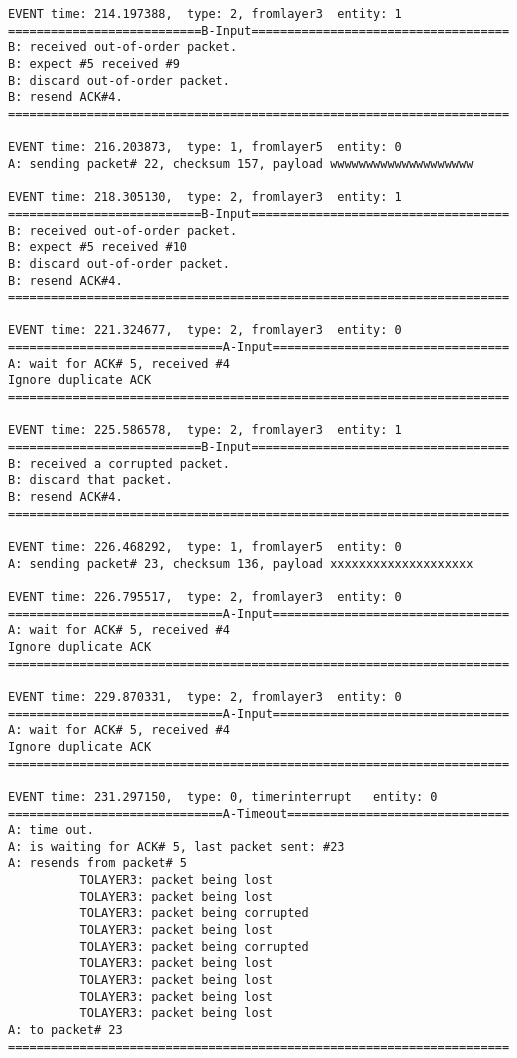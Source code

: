 \documentclass[12pt]{article}
\begin{document}
\begin{verbatim}
EVENT time: 214.197388,  type: 2, fromlayer3  entity: 1
===========================B-Input====================================
B: received out-of-order packet.
B: expect #5 received #9
B: discard out-of-order packet.
B: resend ACK#4.
======================================================================

EVENT time: 216.203873,  type: 1, fromlayer5  entity: 0
A: sending packet# 22, checksum 157, payload wwwwwwwwwwwwwwwwwwww

EVENT time: 218.305130,  type: 2, fromlayer3  entity: 1
===========================B-Input====================================
B: received out-of-order packet.
B: expect #5 received #10
B: discard out-of-order packet.
B: resend ACK#4.
======================================================================

EVENT time: 221.324677,  type: 2, fromlayer3  entity: 0
==============================A-Input=================================
A: wait for ACK# 5, received #4
Ignore duplicate ACK
======================================================================

EVENT time: 225.586578,  type: 2, fromlayer3  entity: 1
===========================B-Input====================================
B: received a corrupted packet.
B: discard that packet.
B: resend ACK#4.
======================================================================

EVENT time: 226.468292,  type: 1, fromlayer5  entity: 0
A: sending packet# 23, checksum 136, payload xxxxxxxxxxxxxxxxxxxx

EVENT time: 226.795517,  type: 2, fromlayer3  entity: 0
==============================A-Input=================================
A: wait for ACK# 5, received #4
Ignore duplicate ACK
======================================================================

EVENT time: 229.870331,  type: 2, fromlayer3  entity: 0
==============================A-Input=================================
A: wait for ACK# 5, received #4
Ignore duplicate ACK
======================================================================

EVENT time: 231.297150,  type: 0, timerinterrupt   entity: 0
==============================A-Timeout===============================
A: time out. 
A: is waiting for ACK# 5, last packet sent: #23
A: resends from packet# 5 
          TOLAYER3: packet being lost
          TOLAYER3: packet being lost
          TOLAYER3: packet being corrupted
          TOLAYER3: packet being lost
          TOLAYER3: packet being corrupted
          TOLAYER3: packet being lost
          TOLAYER3: packet being lost
          TOLAYER3: packet being lost
          TOLAYER3: packet being lost
A: to packet# 23
======================================================================


\end{verbatim}
\end{document}
